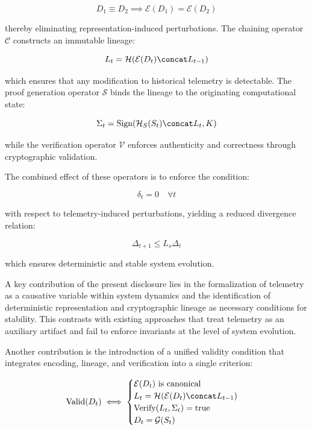 \begin{equation}
D_1 \equiv D_2 \implies \mathcal{E}(D_1) = \mathcal{E}(D_2)
\end{equation}

thereby eliminating representation-induced perturbations. The chaining operator $\mathcal{C}$ constructs an immutable lineage:

\begin{equation}
L_t = \mathcal{H}(\mathcal{E}(D_t) \concat L_{t-1})
\end{equation}

which ensures that any modification to historical telemetry is detectable. The proof generation operator $\mathcal{S}$ binds the lineage to the originating computational state:

\begin{equation}
\Sigma_t = \text{Sign}(\mathcal{H}_S(S_t) \concat L_t, K)
\end{equation}

while the verification operator $\mathcal{V}$ enforces authenticity and correctness through cryptographic validation.

The combined effect of these operators is to enforce the condition:

\begin{equation}
\delta_t = 0 \quad \forall t
\end{equation}

with respect to telemetry-induced perturbations, yielding a reduced divergence relation:

\begin{equation}
\Delta_{t+1} \leq L_s \Delta_t
\end{equation}

which ensures deterministic and stable system evolution.

A key contribution of the present disclosure lies in the formalization of telemetry as a causative variable within system dynamics and the identification of deterministic representation and cryptographic lineage as necessary conditions for stability. This contrasts with existing approaches that treat telemetry as an auxiliary artifact and fail to enforce invariants at the level of system evolution.

Another contribution is the introduction of a unified validity condition that integrates encoding, lineage, and verification into a single criterion:

\begin{equation}
\text{Valid}(D_t) \iff 
\begin{cases}
\mathcal{E}(D_t) \text{ is canonical} \\
L_t = \mathcal{H}(\mathcal{E}(D_t) \concat L_{t-1}) \\
\text{Verify}(L_t, \Sigma_t) = \text{true} \\
D_t = \mathcal{G}(S_t)
\end{cases}
\end{equation}

